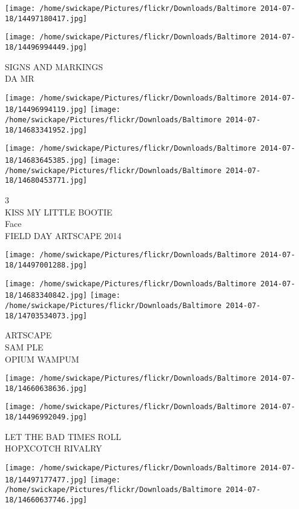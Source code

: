 \documentclass[10pt,letterpaper]{article}
\begin{document}
\texttt{[image: /home/swickape/Pictures/flickr/Downloads/Baltimore 2014-07-18/14497180417.jpg]}

\vspace{0.25in}
\texttt{[image: /home/swickape/Pictures/flickr/Downloads/Baltimore 2014-07-18/14496994449.jpg]}

SIGNS AND MARKINGS\\
DA MR
\pagebreak

\texttt{[image: /home/swickape/Pictures/flickr/Downloads/Baltimore 2014-07-18/14496994119.jpg]}
\texttt{[image: /home/swickape/Pictures/flickr/Downloads/Baltimore 2014-07-18/14683341952.jpg]}

\texttt{[image: /home/swickape/Pictures/flickr/Downloads/Baltimore 2014-07-18/14683645385.jpg]}
\texttt{[image: /home/swickape/Pictures/flickr/Downloads/Baltimore 2014-07-18/14680453771.jpg]}

3\\
KISS MY LITTLE BOOTIE\\
Face\\
FIELD DAY ARTSCAPE 2014
\pagebreak

\texttt{[image: /home/swickape/Pictures/flickr/Downloads/Baltimore 2014-07-18/14497001288.jpg]}

\vspace{0.25in}
\texttt{[image: /home/swickape/Pictures/flickr/Downloads/Baltimore 2014-07-18/14683340842.jpg]}
\texttt{[image: /home/swickape/Pictures/flickr/Downloads/Baltimore 2014-07-18/14703534073.jpg]}

ARTSCAPE\\
SAM PLE\\
OPIUM WAMPUM
\pagebreak

\texttt{[image: /home/swickape/Pictures/flickr/Downloads/Baltimore 2014-07-18/14660638636.jpg]}

\vspace{0.25in}
\texttt{[image: /home/swickape/Pictures/flickr/Downloads/Baltimore 2014-07-18/14496992049.jpg]}

LET THE BAD TIMES ROLL\\
HOPXCOTCH RIVALRY
\pagebreak

\texttt{[image: /home/swickape/Pictures/flickr/Downloads/Baltimore 2014-07-18/14497177477.jpg]}
\texttt{[image: /home/swickape/Pictures/flickr/Downloads/Baltimore 2014-07-18/14660637746.jpg]}
\end{document}
